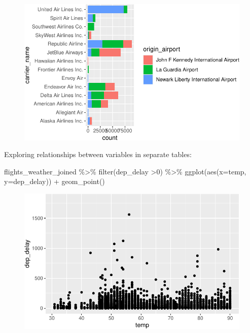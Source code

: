\documentclass[
  letterpaper,
  DIV=11,
  numbers=noendperiod]{scrartcl}
\newenvironment{Shaded}{\begin{snugshade}}{\end{snugshade}}
\newcommand{\AttributeTok}[1]{\textcolor[rgb]{0.40,0.45,0.13}{#1}}
\newcommand{\DecValTok}[1]{\textcolor[rgb]{0.68,0.00,0.00}{#1}}
\newcommand{\FunctionTok}[1]{\textcolor[rgb]{0.28,0.35,0.67}{#1}}
\newcommand{\NormalTok}[1]{\textcolor[rgb]{0.00,0.23,0.31}{#1}}
\newcommand{\SpecialCharTok}[1]{\textcolor[rgb]{0.37,0.37,0.37}{#1}}
\begin{document}
\begin{figure}[H]

{\centering \includegraphics{118_I_joining_files/figure-pdf/unnamed-chunk-9-2.pdf}

}

\end{figure}

Exploring relationships between variables in separate tables:

\begin{Shaded}
\begin{Highlighting}[]
\NormalTok{flights\_weather\_joined }\SpecialCharTok{\%\textgreater{}\%} 
  \FunctionTok{filter}\NormalTok{(dep\_delay }\SpecialCharTok{\textgreater{}}\DecValTok{0}\NormalTok{) }\SpecialCharTok{\%\textgreater{}\%} 
  \FunctionTok{ggplot}\NormalTok{(}\FunctionTok{aes}\NormalTok{(}\AttributeTok{x=}\NormalTok{temp, }\AttributeTok{y=}\NormalTok{dep\_delay)) }\SpecialCharTok{+}
  \FunctionTok{geom\_point}\NormalTok{()}
\end{Highlighting}
\end{Shaded}

\begin{figure}[H]

{\centering \includegraphics{118_I_joining_files/figure-pdf/unnamed-chunk-10-1.pdf}

}

\end{figure}
\end{document}
